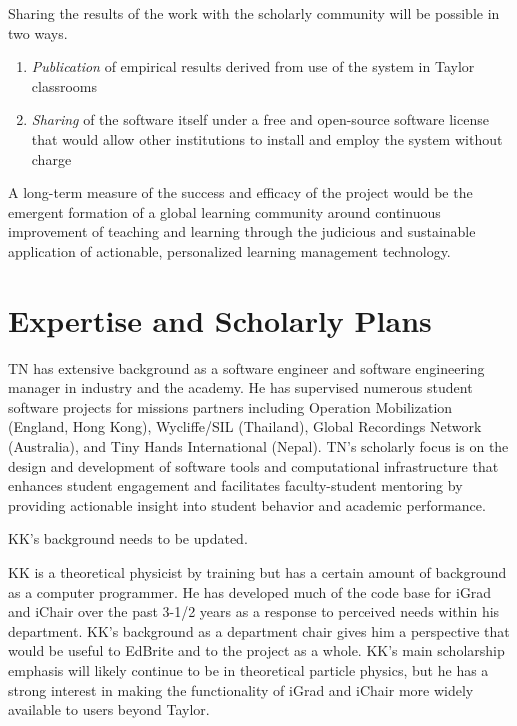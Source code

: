 \documentclass{article}
\begin{document}
Sharing the results of the work with the scholarly community
will be possible in two ways.
\begin{enumerate}
\item \emph{Publication} of empirical results
  derived from use of the system in Taylor classrooms
\item \emph{Sharing} of the software itself
  under a free and open-source software license that would
  allow other institutions to install and employ the
  system without charge
\end{enumerate}

A long-term measure of the success and efficacy of the project
would be the emergent formation of
a global learning community around
continuous improvement of
teaching and learning
through the judicious and sustainable application
of actionable, personalized learning management technology.

\section{Expertise and Scholarly Plans}
\label{sec:expertise-plans}


TN has extensive background as a software engineer
and software engineering manager
in industry and the academy.
He has supervised numerous student software projects
for missions partners including
Operation Mobilization (England, Hong Kong),
Wycliffe/SIL (Thailand),
Global Recordings Network (Australia),
and
Tiny Hands International (Nepal).
TN's scholarly focus is on the design and development
of software tools and computational infrastructure
that enhances student engagement
and facilitates faculty-student mentoring
by providing actionable insight
into student behavior and academic performance.

\begin{framed}
  KK's background needs to be updated.
\end{framed}

KK is a theoretical physicist by training but has a certain amount
of background as a computer programmer.  He has developed much of
the code base for iGrad and iChair over the past 3-1/2 years
as a response to perceived needs within his department.  KK's
background as a department chair gives him a perspective that would
be useful to EdBrite and to the project as a whole.  KK's main
scholarship emphasis will likely continue to be in theoretical
particle physics, but he has a strong interest in making the
functionality of iGrad and iChair more widely available to
users beyond Taylor.
\end{document}
